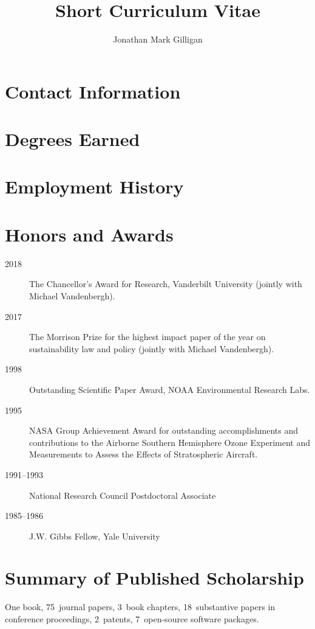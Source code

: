 \documentclass[10pt]{article}
\title{Short Curriculum Vitae}
\date{\thedate}
\author{Jonathan Mark Gilligan}
\begin{document}
\maketitle

\section{Contact Information}


\section{Degrees Earned}
\begin{description}
	
\end{description}
\section{Employment History}


\section{Honors and Awards}
\begin{description}
\item[2018] The Chancellor's Award for Research, Vanderbilt University
  (jointly with Michael Vandenbergh).
\item[2017] The Morrison Prize for the highest impact paper of the year
  on sustainability law and policy (jointly with Michael Vandenbergh).
\item[1998] Outstanding Scientific Paper Award, NOAA Environmental Research
  Labs.
\item[1995] NASA Group Achievement Award for outstanding accomplishments and
  contributions to the Airborne Southern Hemisphere Ozone Experiment and
  Measurements to Assess the Effects of Stratospheric Aircraft.
\item[1991--1993] National Research Council Postdoctoral Associate
\item[1985--1986] J.W. Gibbs Fellow, Yale University
\end{description}

\section{Summary of Published Scholarship}
    One book, 75~journal papers, 3~book chapters, 18~substantive papers in
    conference proceedings, 2~patents, 7~open-source software packages.
\end{document}
